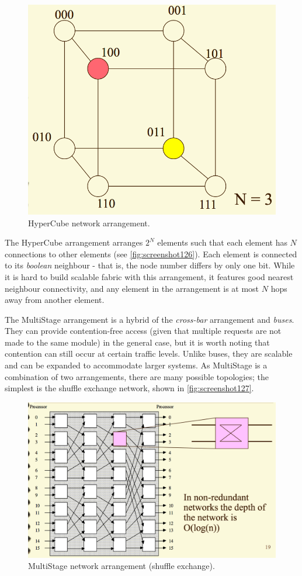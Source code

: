 \pagebreak

\begin{figure}
\centering
\includegraphics[width=0.7\linewidth]{figures/screenshot126}
\caption{HyperCube network arrangement.}
\label{fig:screenshot126}
\end{figure}

The HyperCube arrangement arranges $2^N$ elements such that each element has $N$ connections to other elements (see \autoref{fig:screenshot126}). Each element is connected to its \textit{boolean} neighbour - that is, the node number differs by only one bit. While it is hard to build scalable fabric with this arrangement, it features good nearest neighbour connectivity, and any element in the arrangement is at most $N$ hops away from another element.

The MultiStage arrangement is a hybrid of the \textit{cross-bar} arrangement and \textit{buses}. They can provide contention-free access (given that multiple requests are not made to the same module) in the general case, but it is worth noting that contention can still occur at certain traffic levels. Unlike buses, they are scalable and can be expanded to accommodate larger systems. As MultiStage is a combination of two arrangements, there are many possible topologies; the simplest is the shuffle exchange network, shown in \autoref{fig:screenshot127}.

\begin{figure}
\centering
\includegraphics[width=0.7\linewidth]{figures/screenshot127}
\caption{MultiStage network arrangement (shuffle exchange).}
\label{fig:screenshot127}
\end{figure}

